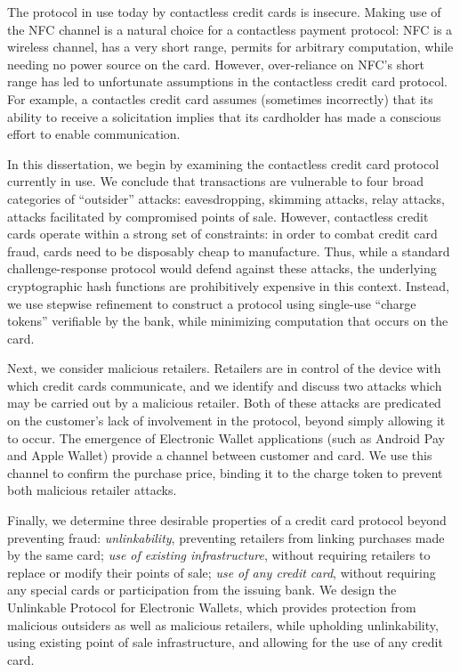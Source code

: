 The protocol in use today by contactless credit cards is insecure.
Making use of the NFC channel is a natural choice for a contactless payment protocol:
    NFC is a wireless channel, has a very short range, permits for arbitrary computation, while needing no power source on the card.
However, over-reliance on NFC's short range has led to unfortunate assumptions in the contactless credit card protocol.
For example, a contactles credit card assumes (sometimes incorrectly) that its ability to receive a solicitation implies that its cardholder has made a conscious effort to enable communication.

In this dissertation, we begin by examining the contactless credit card protocol currently in use.
We conclude that transactions are vulnerable to four broad categories of ``outsider'' attacks:
  eavesdropping, skimming attacks, relay attacks, attacks facilitated by compromised points of sale.
However, contactless credit cards operate within a strong set of constraints:
    in order to combat credit card fraud, cards need to be disposably cheap to manufacture.
Thus, while a standard challenge-response protocol would defend against these attacks,
    the underlying cryptographic hash functions are prohibitively expensive in this context.
Instead, we use stepwise refinement to construct a protocol using single-use ``charge tokens'' verifiable by the bank, while minimizing computation that occurs on the card.

Next, we consider malicious retailers.
Retailers are in control of the device with which credit cards communicate,
    and we identify and discuss two attacks which may be carried out by a malicious retailer.
Both of these attacks are predicated on the customer's lack of involvement in the protocol, beyond simply allowing it to occur.
The emergence of Electronic Wallet applications (such as Android Pay and Apple Wallet) provide a channel between customer and card.
We use this channel to confirm the purchase price, binding it to the charge token to prevent both malicious retailer attacks.

Finally, we determine three desirable properties of a credit card protocol beyond preventing fraud:
    \emph{unlinkability}, preventing retailers from linking purchases made by the same card;
    \emph{use of existing infrastructure}, without requiring retailers to replace or modify their points of sale;
    \emph{use of any credit card}, without requiring any special cards or participation from the issuing bank.
We design the Unlinkable Protocol for Electronic Wallets, which provides protection from malicious outsiders as well as malicious retailers,
    while upholding unlinkability, using existing point of sale infrastructure, and allowing for the use of any credit card.
